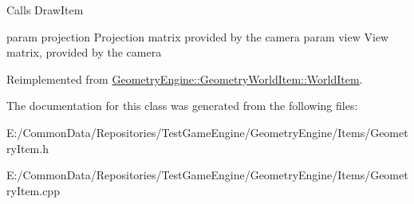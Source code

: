 Calls Draw\+Item

param projection Projection matrix provided by the camera param view View matrix, provided by the camera 

Reimplemented from \mbox{\hyperlink{class_geometry_engine_1_1_geometry_world_item_1_1_world_item_aa6e82e5d95ae34d0addb991cd84aca6f}{Geometry\+Engine\+::\+Geometry\+World\+Item\+::\+World\+Item}}.



The documentation for this class was generated from the following files\+:\begin{DoxyCompactItemize}
\item 
E\+:/\+Common\+Data/\+Repositories/\+Test\+Game\+Engine/\+Geometry\+Engine/\+Items/Geometry\+Item.\+h\item 
E\+:/\+Common\+Data/\+Repositories/\+Test\+Game\+Engine/\+Geometry\+Engine/\+Items/Geometry\+Item.\+cpp\end{DoxyCompactItemize}
